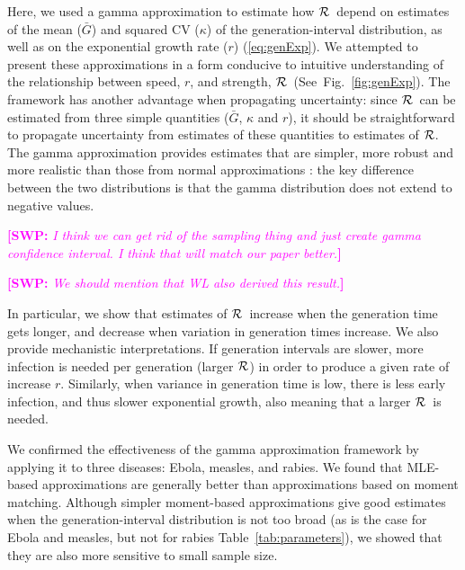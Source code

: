 \documentclass[12pt,]{article}
\newcommand{\RR}{\ensuremath{{\cal R}}}
\newcommand{\eref}[1]{(\ref{eq:#1})}
\newcommand{\fref}[1]{Fig.~\ref{fig:#1}}
\newcommand{\tref}[1]{Table~\ref{tab:#1}}
\newcommand{\comment}[3]{\textcolor{#1}{\textbf{[#2: }\textit{#3}\textbf{]}}}
\newcommand{\swp}[1]{\comment{magenta}{SWP}{#1}}
\begin{document}
Here, we used a gamma approximation \cite{NishCast09} to estimate how \RR\ depend on estimates of the mean ($\bar G$) and squared CV ($\kappa$) of the generation-interval distribution, as well as on the exponential growth rate ($r$) \eref{genExp}. 
We attempted to present these approximations in a form conducive to intuitive understanding of the relationship between speed, $r$, and strength, \RR\ (See~\fref{genExp}).
The framework has another advantage when propagating uncertainty: since \RR\ can be estimated from three simple quantities ($\bar G$, $\kappa$ and $r$), it should be straightforward to propagate uncertainty from estimates of these quantities to estimates of \RR.
The gamma approximation provides estimates that are simpler, more robust and more realistic than those from normal approximations \cite{WallLips07}:
the key difference between the two distributions is that the gamma distribution does not extend to negative values.

\swp{I think we can get rid of the sampling thing and just create gamma confidence interval. I think that will match our paper better.}

\swp{We should mention that WL also derived this result.}

In particular, we show that estimates of \RR\ increase when the generation time gets longer, and decrease when variation in generation times increase. We also provide mechanistic interpretations. If generation intervals are slower, more infection is needed per generation (larger \RR)  in order to produce a given rate of increase $r$. Similarly, when variance in generation time is low, there is less early infection, and thus slower exponential growth, also meaning that a larger \RR\ is needed. 

We confirmed the effectiveness of the gamma approximation framework by applying it to three diseases: Ebola, measles, and rabies. 
We found that MLE-based approximations are generally better than approximations based on moment matching. Although simpler moment-based approximations give good estimates when the generation-interval distribution is not too broad (as is the case for Ebola and measles, but not for rabies \tref{parameters}), we showed that they are also more sensitive to small sample size.

\end{document}
